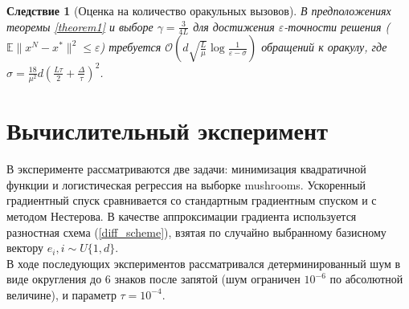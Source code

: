 \documentclass{article}
\newtheorem{corollary}{Следствие}
\begin{document}
\begin{corollary}[Оценка на количество оракульных вызовов]\label{corollary1}
 В предположениях теоремы \ref{theorem1} и выборе $\gamma = \frac{3}{4L}$ для достижения $\varepsilon$-точности решения ($\mathbb{E} \|x^N - x^*\|^2 \leqslant \varepsilon$) требуется $\mathcal{O}\left(d \sqrt{\frac{L}{\mu}} \log \frac{1}{\varepsilon - \sigma}\right)$ обращений к оракулу, где $\sigma = \frac{18}{\mu^2} d \left(\frac{L \tau}{2} + \frac{\Delta}{\tau}\right)^2$.
\end{corollary}


\section{Вычислительный эксперимент}
В эксперименте рассматриваются две задачи: минимизация квадратичной функции и логистическая регрессия на выборке mushrooms. Ускоренный градиентный спуск сравнивается со стандартным градиентным спуском и с методом Нестерова. В качестве аппроксимации градиента используется разностная схема (\ref{diff_scheme}), взятая по случайно выбранному базисному вектору $e_i, i \sim U\{1, d\}$.\\
В ходе последующих экспериментов рассматривался детерминированный шум в виде округления до 6 знаков после запятой (шум ограничен $10^{-6}$ по абсолютной величине), и параметр $\tau = 10^{-4}$.
\end{document}
